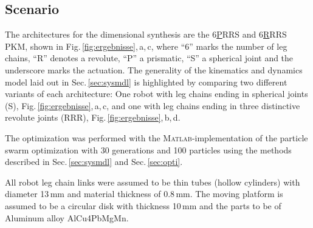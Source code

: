 \documentclass[fleqn,a4paper,10pt]{article}
\begin{document}
\begin{multicols}{2}




\subsection{Scenario}
\label{sec:res_scenario}

The architectures for the dimensional synthesis are the 6\underline{P}RRS and 6\underline{R}RRS PKM, shown in Fig.\,\ref{fig:ergebnisse},\,a,\,c, where ``6'' marks the number of leg chains, ``R'' denotes a revolute, ``P'' a prismatic, ``S'' a spherical joint and the underscore marks the actuation.
The generality of the kinematics and dynamics model laid out in Sec.\,\ref{sec:sysmdl} is highlighted by comparing two different variants of each architecture: One robot with leg chains ending in spherical joints (S), Fig.\,\ref{fig:ergebnisse},\,a,\,c, and one with leg chains ending in three distinctive revolute joints (RRR), Fig.\,\ref{fig:ergebnisse},\,b,\,d.

The optimization was performed with the \textsc{Matlab}-implementation of the particle swarm optimization \cite{MatlabPSO} with 30 generations and 100 particles using the methods described in Sec.\,\ref{sec:sysmdl} and Sec.\,\ref{sec:opti}.

All robot leg chain links were assumed to be thin tubes (hollow cylinders) with diameter 13\,mm and material thickness of 0.8\,mm.
The moving platform is assumed to be a circular disk with thickness 10\,mm and the parts to be of Aluminum alloy AlCu4PbMgMn.


\end{multicols}
\end{document}

